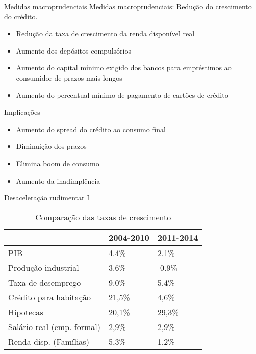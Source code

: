 \documentclass[presentation]{beamer}
\begin{document}
\begin{frame}[label={sec:org630ab6a}]{Medidas macroprudenciais}
\alert{Medidas macroprudenciais:} Redução do crescimento do crédito.

\begin{itemize}
\item Redução da taxa de crescimento da renda disponível real
\item Aumento dos depósitos compulsórios
\item Aumento do capital mínimo exigido dos bancos para empréstimos ao consumidor de prazos mais longos
\item Aumento do percentual mínimo de pagamento de cartões de crédito
\end{itemize}

\begin{block}{Implicações}
\begin{itemize}
\item Aumento do spread do crédito ao consumo final
\item Diminuição dos prazos
\item Elimina \alert{boom} de consumo
\item Aumento da inadimplência
\end{itemize}
\end{block}
\end{frame}


\begin{frame}[label={sec:org10aa293}]{Desaceleração rudimentar I}
\begin{table}[htbp]
\caption{Comparação das taxas de crescimento}
\centering
\begin{tabular}{lll}
\hline
 & 2004-2010 & 2011-2014\\
\hline
PIB & 4.4\% & 2.1\%\\
Produção industrial & 3.6\% & -0.9\%\\
Taxa de desemprego & 9.0\% & 5.4\%\\
Crédito para habitação & 21,5\% & 4,6\%\\
Hipotecas & 20,1\% & 29,3\%\\
Salário real (emp. formal) & 2,9\% & 2,9\%\\
Renda disp. (Famílias) & 5,3\% & 1,2\%\\
\hline
\end{tabular}
\end{table}
\end{frame}
\end{document}
